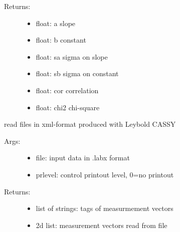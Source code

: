 \documentclass[letterpaper,10pt,english]{sphinxmanual}
\begin{document}
\begin{fulllineitems}
\begin{quote}
\begin{description}
\end{description}
\end{quote}
\begin{description}
\item[{Returns:}] \leavevmode\begin{itemize}
\item {} 
float: a     slope

\item {} 
float: b     constant

\item {} 
float: sa    sigma on slope

\item {} 
float: sb    sigma on constant

\item {} 
float: cor   correlation

\item {} 
float: chi2  chi-square

\end{itemize}

\end{description}

\end{fulllineitems}


\begin{fulllineitems}
\label{\detokenize{index:PhyPraKit.PhyPraKit.labxParser}}
read files in xml-format produced with Leybold CASSY
\begin{description}
\item[{Args:}] \leavevmode\begin{itemize}
\item {} 
file:  input data in .labx format

\item {} 
prlevel: control printout level, 0=no printout

\end{itemize}

\item[{Returns:}] \leavevmode\begin{itemize}
\item {} 
list of strings: tags of measurmement vectors

\item {} 
2d list:         measurement vectors read from file

\end{itemize}

\end{description}

\end{fulllineitems}
\end{document}
